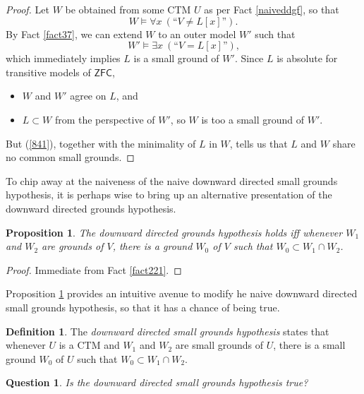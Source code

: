 \documentclass[12pt, twoside]{memoir}
\numberwithin{equation}{section}
\newtheorem{prop}[thm]{Proposition}
\newtheorem{ques}[thm]{Question}
\theoremstyle{definition}
\newtheorem{defi}[thm]{Definition}
\theoremstyle{remark}
\theoremstyle{definition}
\theoremstyle{definition}
\theoremstyle{definition}
\theoremstyle{remark}
\begin{document}
\begin{proof}
Let $W$ be obtained from some CTM $U$ as per Fact \ref{naiveddgf}, so that 
\begin{equation}\label{841}
    W \models \forall x \ (\text{``} V \neq L[x] \text{''}) \text{.}
\end{equation} 
By Fact \ref{fact37}, we can extend $W$ to an outer model $W'$ such that $$W' \models \exists x \ (\text{``} V = L[x] \text{''}) \text{,}$$ which immediately implies $L$ is a small ground of $W'$. Since $L$ is absolute for transitive models of $\mathsf{ZFC}$, 
\begin{itemize}
    \item $W$ and $W'$ agree on $L$, and
    \item $L \subset W$ from the perspective of $W'$, so $W$ is too a small ground of $W'$.
\end{itemize} 
But (\ref{841}), together with the minimality of $L$ in $W$, tells us that $L$ and $W$ share no common small grounds.
\end{proof}

To chip away at the naiveness of the naive downward directed small grounds hypothesis, it is perhaps wise to bring up an alternative presentation of the downward directed grounds hypothesis.

\begin{prop}\label{prop8410}
The downward directed grounds hypothesis holds iff whenever $W_1$ and $W_2$ are grounds of $V$, there is a ground $W_0$ of $V$ such that $W_0 \subset W_1 \cap W_2$.
\end{prop}

\begin{proof}
Immediate from Fact \ref{fact221}.
\end{proof}

Proposition \ref{prop8410} provides an intuitive avenue to modify he naive downward directed small grounds hypothesis, so that it has a chance of being true.

\begin{defi}\label{ddsg}
The \emph{downward directed small grounds hypothesis} states that whenever $U$ is a CTM and $W_1$ and $W_2$ are small grounds of $U$, there is a small ground $W_0$ of $U$ such that $W_0 \subset W_1 \cap W_2$.
\end{defi}

\begin{ques}
Is the downward directed small grounds hypothesis true?
\end{ques}
\end{document}
